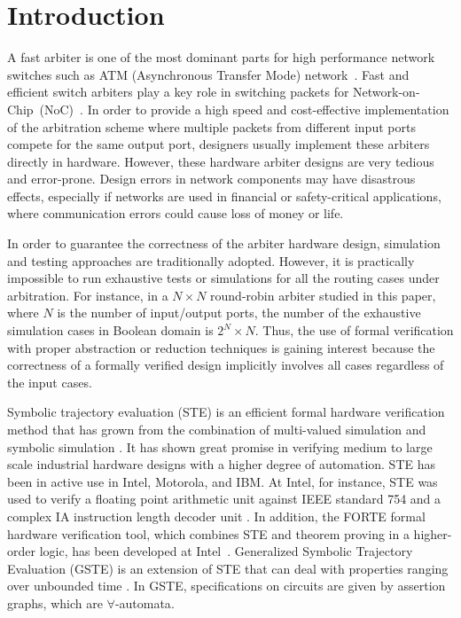 \documentclass[final]{IEEEtran}
\begin{document}
\section{Introduction}

A fast arbiter is one of the most dominant parts for high
performance network switches such as ATM (Asynchronous Transfer
Mode) network~\cite{GinsburgATM,Paul94}. Fast and efficient
switch arbiters play a key role in switching packets for
Network-on-Chip~(NoC)~\cite{DallyNOC}.
In order to provide a high speed and
cost-effective implementation of the arbitration scheme where
multiple packets from different input ports compete for the same
output port, designers usually implement these arbiters directly in hardware.
However, these hardware arbiter designs are
very tedious and error-prone. Design errors in network components
may have disastrous effects, especially if networks are used in
financial or safety-critical applications, where communication
errors could cause loss of money or life.

In order to guarantee the correctness of the arbiter hardware
design, simulation and testing approaches are traditionally adopted.
However, it is practically impossible to run exhaustive tests or
simulations for all the routing cases under arbitration. For
instance, in a $N\times N$ round-robin arbiter studied in this
paper, where $N$ is the number of input/output ports, the number of
 the exhaustive simulation cases in Boolean domain is $2^N\times N$.
Thus, the use of formal verification with proper abstraction or
reduction techniques is gaining interest because the correctness of
a formally verified design implicitly
involves all cases regardless of the input cases. %


Symbolic trajectory evaluation (STE) is an efficient formal hardware
verification method that has grown from the combination of
multi-valued simulation and symbolic simulation
\cite{CarFmBySymEvaOfPartTraj}. It has shown great promise in
verifying medium to large scale industrial hardware designs with a
higher degree of automation. STE has been in active use in Intel,
Motorola, and IBM. At Intel, for instance, STE was used to verify a
floating point arithmetic unit against IEEE standard 754 and a
complex IA
instruction length decoder unit \cite%
{joeraeryFloatPoint,aggardCombineTheoremSTE}. In addition, the FORTE
formal hardware verification tool, which combines STE and theorem
proving in a higher-order logic, has been developed at
Intel~\cite{Forte}.
 Generalized
Symbolic Trajectory Evaluation (GSTE) is an extension of STE that
can deal with properties ranging over unbounded time
\cite{YangS03,yangTech,DBLP:conf/iccad/YangG02}. In GSTE,
specifications on circuits are given by assertion graphs, which are
$\forall$-automata\cite{Manna:1987:SVC:41625.41626}.
\end{document}

